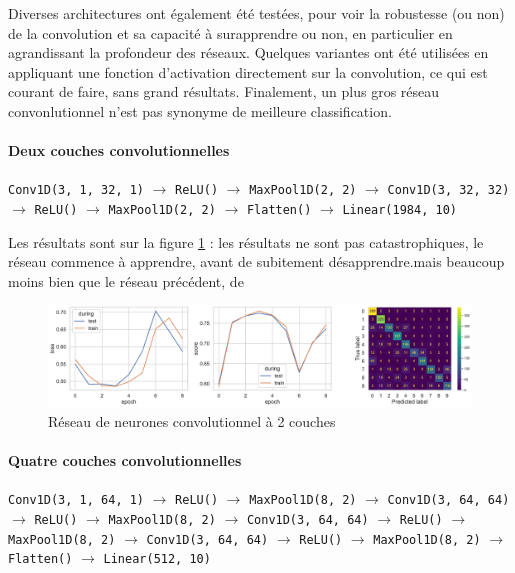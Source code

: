 \documentclass{article}
\begin{document}
Diverses architectures ont également été testées, pour voir la robustesse (ou non) de la convolution et sa capacité à surapprendre ou non, en particulier en agrandissant la profondeur des réseaux. Quelques variantes ont été utilisées en appliquant une fonction d'activation directement sur la convolution, ce qui est courant de faire, sans grand résultats. Finalement, un plus gros réseau convonlutionnel n'est pas synonyme de meilleure classification.

\paragraph*{Deux couches convolutionnelles} 

\texttt{Conv1D(3, 1, 32, 1)} $\rightarrow$ \texttt{ReLU()} $\rightarrow$ \texttt{MaxPool1D(2, 2)} $\rightarrow$
\texttt{Conv1D(3, 32, 32)} $\rightarrow$ \texttt{ReLU()} $\rightarrow$ \texttt{MaxPool1D(2, 2)} $\rightarrow$
\texttt{Flatten()} $\rightarrow$
\texttt{Linear(1984, 10)}

Les résultats sont sur la figure \ref*{fig:conv2layers} : les résultats ne sont pas catastrophiques, le réseau commence à apprendre, avant de subitement désapprendre.mais beaucoup moins bien que le réseau précédent, de 

\begin{figure}[htbp]
    \centering
    \includegraphics[width=\textwidth]{conv/conv_2layers.pdf}
    \caption{Réseau de neurones convolutionnel à 2 couches}
    \label{fig:conv2layers}
\end{figure}

\paragraph*{Quatre couches convolutionnelles}

\texttt{Conv1D(3, 1, 64, 1)} $\rightarrow$ \texttt{ReLU()} $\rightarrow$ \texttt{MaxPool1D(8, 2)} $\rightarrow$
\texttt{Conv1D(3, 64, 64)} $\rightarrow$ \texttt{ReLU()} $\rightarrow$ \texttt{MaxPool1D(8, 2)} $\rightarrow$
\texttt{Conv1D(3, 64, 64)} $\rightarrow$ \texttt{ReLU()} $\rightarrow$ \texttt{MaxPool1D(8, 2)} $\rightarrow$
\texttt{Conv1D(3, 64, 64)} $\rightarrow$ \texttt{ReLU()} $\rightarrow$ \texttt{MaxPool1D(8, 2)} $\rightarrow$
\texttt{Flatten()} $\rightarrow$
\texttt{Linear(512, 10)}
\end{document}
